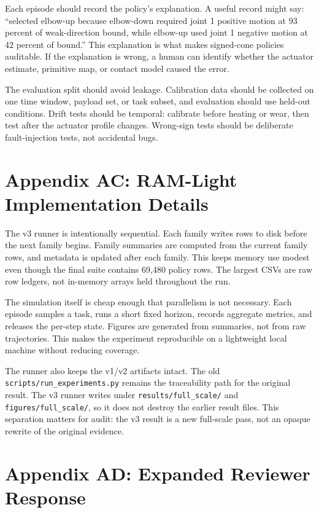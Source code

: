 \documentclass{article}
\begin{document}
Each episode should record the policy's explanation. A useful record might say: ``selected elbow-up because elbow-down required joint 1 positive motion at 93 percent of weak-direction bound, while elbow-up used joint 1 negative motion at 42 percent of bound.'' This explanation is what makes signed-cone policies auditable. If the explanation is wrong, a human can identify whether the actuator estimate, primitive map, or contact model caused the error.

The evaluation split should avoid leakage. Calibration data should be collected on one time window, payload set, or task subset, and evaluation should use held-out conditions. Drift tests should be temporal: calibrate before heating or wear, then test after the actuator profile changes. Wrong-sign tests should be deliberate fault-injection tests, not accidental bugs.

\section*{Appendix AC: RAM-Light Implementation Details}

The v3 runner is intentionally sequential. Each family writes rows to disk before the next family begins. Family summaries are computed from the current family rows, and metadata is updated after each family. This keeps memory use modest even though the final suite contains 69,480 policy rows. The largest CSVs are raw row ledgers, not in-memory arrays held throughout the run.

The simulation itself is cheap enough that parallelism is not necessary. Each episode samples a task, runs a short fixed horizon, records aggregate metrics, and releases the per-step state. Figures are generated from summaries, not from raw trajectories. This makes the experiment reproducible on a lightweight local machine without reducing coverage.

The runner also keeps the v1/v2 artifacts intact. The old \texttt{scripts/run\_experiments.py} remains the traceability path for the original result. The v3 runner writes under \texttt{results/full\_scale/} and \texttt{figures/full\_scale/}, so it does not destroy the earlier result files. This separation matters for audit: the v3 result is a new full-scale pass, not an opaque rewrite of the original evidence.

\section*{Appendix AD: Expanded Reviewer Response}
\end{document}
